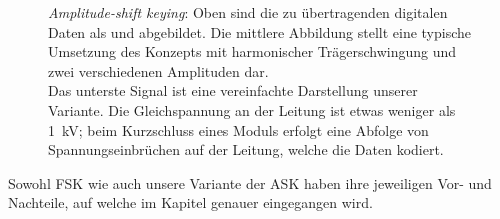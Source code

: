 
\begin{figure}[h!tb]
    \centering
    
    \caption{%
        \emph{Amplitude-shift  keying}: Oben   sind  die   zu  \"ubertragenden
        digitalen  Daten als   und   abgebildet. Die  mittlere
        Abbildung stellt eine typische Umsetzung des Konzepts mit harmonischer
        Tr\"agerschwingung und zwei verschiedenen Amplituden dar.\protect\\
        Das  unterste   Signal  ist  eine  vereinfachte   Darstellung  unserer
        Variante.  Die  Gleichspannung an  der Leitung  ist etwas  weniger als
        \SI{1}{\kilo\volt}; beim Kurzschluss eines Moduls erfolgt eine Abfolge
        von Spannungseinbr\"uchen auf der Leitung, welche die Daten kodiert.%
    }
    \label{fig:ask:concept}
\end{figure}


Sowohl  FSK wie  auch  unsere  Variante der  ASK  haben  ihre jeweiligen  Vor-
und  Nachteile,  auf  welche im  Kapitel  \emph{}  genauer
eingegangen wird.
